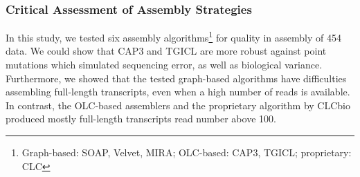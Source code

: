 \subsubsection{Critical Assessment of Assembly Strategies
\cite{mp_Braeutigam2011}}

In this study, we tested six assembly algorithms\footnote{Graph-based: SOAP, Velvet, MIRA; OLC-based: CAP3, TGICL; proprietary: CLC} for quality in  assembly of 454 data. We could show that CAP3 and TGICL are more robust against point mutations which simulated sequencing error, as well as biological variance.
Furthermore, we showed that the tested graph-based algorithms have difficulties assembling full-length transcripts, even when a high number of reads is available. In contrast, the OLC-based assemblers and the proprietary algorithm by CLCbio produced mostly full-length transcripts read number above 100.

